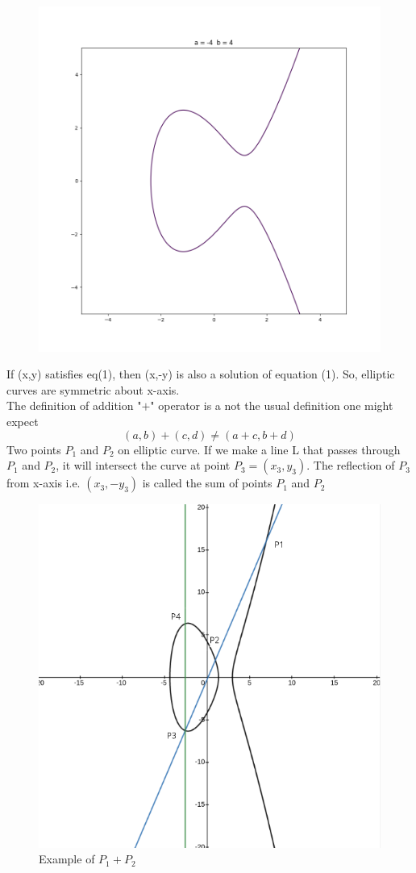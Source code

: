 \documentclass[12pt,a4paper]{report}
\begin{document}
\begin{figure}[h!]
\includegraphics[scale=0.32]{Figure_4}
\end{figure}
\cleardoublepage
If (x,y) satisfies eq(1), then (x,-y) is also a solution of equation (1). So, elliptic curves are symmetric about x-axis. \\
The definition of addition "$+$" operator is a not the usual definition one might expect 
$$(a,b)+(c,d) \neq (a+c,b+d)$$
Two points $P_1$ and $P_2$ on elliptic curve. If we make a line L that passes through $P_1$ and $P_2$, it will intersect the curve at point $P_3=(x_3,y_3)$. The reflection of $P_3$ from x-axis i.e. $(x_3,-y_3)$ is called the sum of points $P_1$ and $P_2$
\begin{figure}[h!]
\begin{center}
\caption{Example of $P_1+P_2$}
\includegraphics[scale=0.4]{2}
\end{center}
\end{figure}
\end{document}

